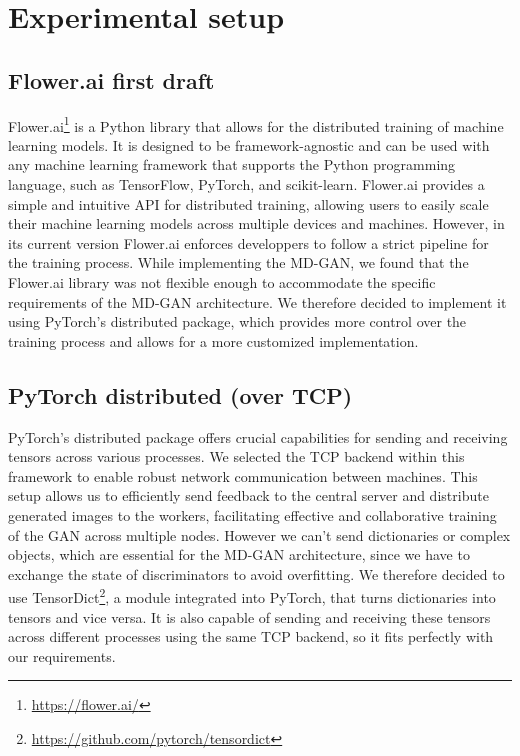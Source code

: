 \chapter{Experimental setup}
\section{Flower.ai first draft}
Flower.ai\footnote{\url{https://flower.ai/}} is a Python library that allows for the distributed training of machine learning models. It is designed to be framework-agnostic and can be used with any machine learning framework that supports the Python programming language, such as TensorFlow, PyTorch, and scikit-learn. Flower.ai provides a simple and intuitive API for distributed training, allowing users to easily scale their machine learning models across multiple devices and machines. However, in its current version Flower.ai enforces developpers to follow a strict pipeline for the training process. While implementing the MD-GAN, we found that the Flower.ai library was not flexible enough to accommodate the specific requirements of the MD-GAN architecture. We therefore decided to implement it using PyTorch's distributed package, which provides more control over the training process and allows for a more customized implementation.

\section{PyTorch distributed (over TCP)}
PyTorch's distributed package offers crucial capabilities for sending and receiving tensors across various processes. We selected the TCP backend within this framework to enable robust network communication between machines. This setup allows us to efficiently send feedback to the central server and distribute generated images to the workers, facilitating effective and collaborative training of the GAN across multiple nodes. However we can't send dictionaries or complex objects, which are essential for the MD-GAN architecture, since we have to exchange the state of discriminators to avoid overfitting. We therefore decided to use TensorDict\footnote{\url{https://github.com/pytorch/tensordict}}, a module integrated into PyTorch, that turns dictionaries into tensors and vice versa. It is also capable of sending and receiving these tensors across different processes using the same TCP backend, so it fits perfectly with our requirements.

